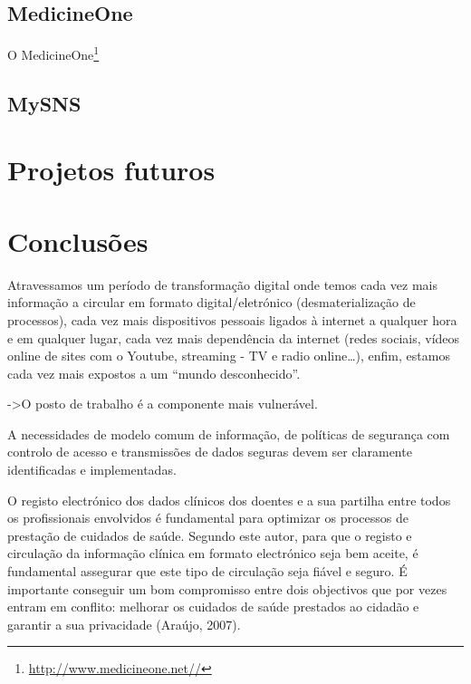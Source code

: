 \documentclass[conference]{IEEEtran}
\begin{document}
\subsection{MedicineOne}

O MedicineOne\footnote{\url{http://www.medicineone.net//}}



\subsection{MySNS}




\section{Projetos futuros}













\section{Conclusões}


Atravessamos um período de transformação digital onde temos cada vez mais informação a
circular em formato digital/eletrónico (desmaterialização de processos), cada vez mais
dispositivos pessoais ligados à internet a qualquer hora e em qualquer lugar, cada vez mais
dependência da internet (redes sociais, vídeos online de sites com o Youtube, streaming - TV
e radio online…), enfim, estamos cada vez mais expostos a um “mundo desconhecido”.	

->O posto de trabalho é a componente mais vulnerável.

A necessidades de modelo comum de informação, de políticas de segurança com controlo de acesso
e transmissões de dados seguras devem ser claramente identificadas e implementadas.

O registo electrónico dos dados clínicos dos doentes e a sua partilha entre todos os
profissionais envolvidos é fundamental para optimizar os processos de prestação de
cuidados de saúde. Segundo este autor, para que o registo e circulação da informação
clínica em formato electrónico seja bem aceite, é fundamental assegurar que este tipo de
circulação seja fiável e seguro. É importante conseguir um bom compromisso entre dois
objectivos que por vezes entram em conflito: melhorar os cuidados de saúde prestados
ao cidadão e garantir a sua privacidade (Araújo, 2007). 





{}

\end{document}
